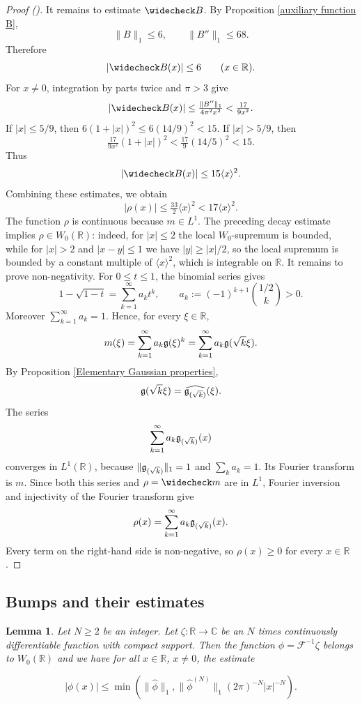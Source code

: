 \documentclass[12pt,reqno]{amsart}
\newcommand{\auto}{{({\tiny\faCar})}}
\theoremstyle{plain}
\newtheorem{lemma}[theorem]{Lemma}
\numberwithin{equation}{section}
\theoremstyle{remark}
\newcommand{\uses}[1]{}
\newcommand{\usesdefs}[1]{}
\newcommand{\R}{{\mathbb R}}
\newcommand{\C}{{\mathbb C}}
\begin{document}
\begin{proof}[Proof \auto]
It remains to estimate \(\widecheck B\). By Proposition \ref{auxiliary function B},
\[
    \|B\|_1\le 6,
    \qquad
    \|B''\|_1\le 68.
\]
Therefore
\[
    |\widecheck B(x)|\le 6
    \qquad (x\in\R).
\]
For \(x\neq 0\), integration by parts twice and $\pi>3$ give
\[
    |\widecheck B(x)|
    \le
    \tfrac{\|B''\|_1}{4\pi^2x^2}
    <
    \tfrac{17}{9x^2}.
\]
If $|x|\le5/9$, then
$6(1+|x|)^2\le6(14/9)^2<15$.
If $|x|>5/9$, then
\[
\tfrac{17}{9x^2}(1+|x|)^2
<\tfrac{17}{9}(14/5)^2<15.
\]
Thus
\begin{equation}\label{eq:Bcheck-decay}
|\widecheck B(x)|\le15\langle x\rangle^2.
\end{equation}
Combining these estimates, we obtain
\[
|\rho(x)|\le\tfrac{33}{2}\langle x\rangle^2
<17\langle x\rangle^2.
\]
The function \(\rho\) is continuous because \(m\in L^1\). The preceding decay estimate implies
\(\rho\in W_0(\R)\): indeed, for \(|x|\le 2\) the local \(W_0\)-supremum is bounded, while for
\(|x|>2\) and \(|x-y|\le 1\) we have \(|y|\ge |x|/2\), so the local supremum is bounded by a
constant multiple of \(\langle x\rangle^{2}\), which is integrable on \(\R\).
It remains to prove non-negativity. For \(0\le t\le 1\), the binomial series gives
\[
    1-\sqrt{1-t}
    =
    \sum_{k=1}^\infty a_k t^k,
    \qquad
    a_k:=(-1)^{k+1}\binom{1/2}{k}>0.
\]
Moreover \(\sum_{k=1}^\infty a_k=1\). Hence, for every \(\xi\in\R\),
\[
    m(\xi)
    =
    \sum_{k=1}^\infty a_k \mathfrak{g}(\xi)^k
    =
    \sum_{k=1}^\infty a_k \mathfrak{g}(\sqrt{k}\xi).
\]
By Proposition \ref{Elementary Gaussian properties},
\[
    \mathfrak{g}(\sqrt{k}\xi)=\widehat{\mathfrak{g}_{(\sqrt{k})}}(\xi).
\]
The series
\[
\sum_{k=1}^\infty a_k\mathfrak{g}_{(\sqrt{k})}(x)
\]
converges in $L^1(\R)$, because $\|\mathfrak{g}_{(\sqrt{k})}\|_1=1$ and $\sum_ka_k=1$. Its Fourier transform is $m$. Since both this series and $\rho=\widecheck m$ are in $L^1$, Fourier inversion and injectivity of the Fourier transform give
\[
    \rho(x)
    =
    \sum_{k=1}^\infty a_k \mathfrak{g}_{(\sqrt{k})}(x).
\]
Every term on the right-hand side is non-negative, so \(\rho(x)\ge 0\) for every \(x\in\R\).
\end{proof}

\subsection{Bumps and their estimates}\label{bump section}


\begin{lemma}
\label{lem:smoothdecay}\uses{}\usesdefs{auto:Wiener-space-definition}
Let $N\geq 2$ be an integer. Let $\zeta:\R\to\C$ be an $N$ times continuously differentiable function with compact support. Then the function $\phi=\mathcal F^{-1}\zeta$ belongs to $W_0(\R)$ and we have for all $x\in\R$, $x\neq0$, the estimate


\begin{equation}\label{auto:Fourier-decay-minimum-bound}|\phi(x)|\le \min(\|\widehat{\phi}\|_1, \|\widehat{\phi}^{(N)}\|_1 (2\pi)^{-N} |x|^{-N}).\end{equation}
\end{lemma}
\end{document}
